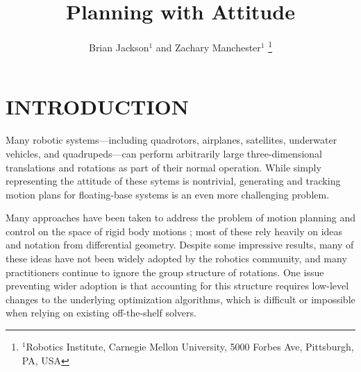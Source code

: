 \documentclass[letterpaper, 10 pt, conference]{ieeeconf}  %
\title{\LARGE \bf
Planning with Attitude
}
\author{Brian Jackson$^1$ and Zachary Manchester$^1$%
    \thanks{
        $^1$Robotics Institute, 
        Carnegie Mellon University, 
        5000 Forbes Ave, Pittsburgh, PA, USA
    }
}
\newcommand{\todo}[1]{\textcolor{red}{TODO: #1}}
\begin{document}
\maketitle


\section{INTRODUCTION} 

    Many robotic systems---including quadrotors, airplanes, satellites, 
    underwater vehicles, and quadrupeds---can perform arbitrarily large three-dimensional
    translations and rotations as part of their normal operation. While simply
    representing the attitude of these sytems is nontrivial, generating and tracking
    motion plans for floating-base systems is an even more challenging problem.

    Many approaches have been taken to address the problem of motion planning and control
    on the space of rigid body motions \cite{Kobilarov2011, Saccon2013,
    watterson2020control}; most of these rely heavily on ideas and notation from
    differential geometry. Despite some impressive results, many of these ideas have not
    been widely adopted by the robotics community, and many practitioners continue to
    ignore the group structure of rotations. One issue preventing wider adoption is that
    accounting for this structure requires low-level changes to the underlying
    optimization algorithms, which is difficult or impossible when relying on existing
    off-the-shelf solvers.
    
\end{document}
